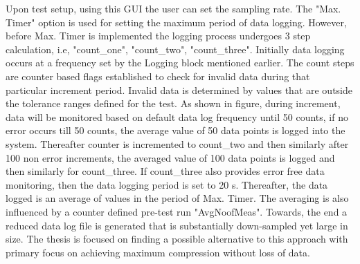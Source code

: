 Upon test setup, using this GUI the user can set the sampling rate. The "Max. Timer" option is used for setting the maximum period of data logging. However, before Max. Timer is implemented the logging process undergoes 3 step calculation, i.e, "count\_one", "count\_two", "count\_three". Initially data logging occurs at a frequency set by the Logging block mentioned earlier. The count steps are counter based flags established to check for invalid data during that particular increment period. Invalid data is determined by values that are outside the tolerance ranges defined for the test. As shown in figure, during increment, data will be monitored based on default data log frequency until 50 counts, if no error occurs till 50 counts, the average value of 50 data points is logged into the system. Thereafter counter is incremented to count\_two and then similarly after 100 non error increments, the averaged value of 100 data points is logged and then similarly for count\_three. If count\_three also provides error free data monitoring, then the data logging period is set to 20 s. Thereafter, the 
data logged is an average of values in the period of Max. Timer. The averaging is also influenced by a counter defined pre-test run "AvgNoofMeas". Towards, the end a reduced data log file is generated that is substantially down-sampled yet large in size. The thesis is focused on finding a possible alternative to this approach with primary focus on achieving maximum compression without loss of data. 

